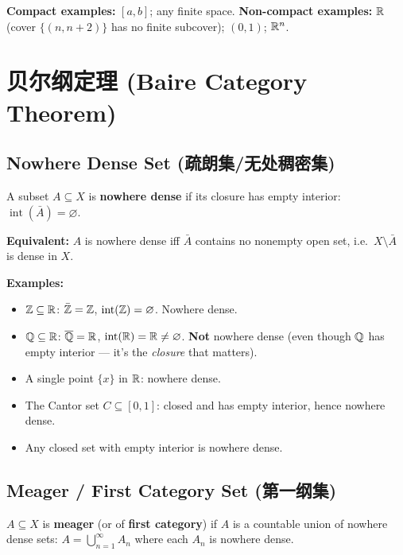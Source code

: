 \documentclass{article}
\begin{document}
\textbf{Compact examples:} $[a, b]$; any finite space.
\textbf{Non-compact examples:} $\mathbb{R}$ (cover $\{(n, n+2)\}$ has no
finite subcover); $(0, 1)$; $\mathbb{R}^n$.

\section{贝尔纲定理 (Baire Category Theorem)}

\subsection{Nowhere Dense Set (疏朗集/无处稠密集)}\label{def:nowhere-dense-baire}
\begin{definition}
  A subset $A \subseteq X$ is \textbf{nowhere dense} if its closure has
  empty interior: $\operatorname{int}(\bar{A}) = \varnothing$.
\end{definition}

\textbf{Equivalent:} $A$ is nowhere dense iff $\bar{A}$ contains no
nonempty open set, i.e.\ $X \setminus \bar{A}$ is dense in $X$.

\textbf{Examples:}
\begin{itemize}
  \item $\mathbb{Z} \subseteq \mathbb{R}$: $\bar{\mathbb{Z}} = \mathbb{Z}$, $\operatorname{int}(\mathbb{Z}) =
    \varnothing$.
    Nowhere dense.
  \item $\mathbb{Q} \subseteq \mathbb{R}$: $\overline{\mathbb{Q}} = \mathbb{R}$,
    $\operatorname{int}(\mathbb{R}) = \mathbb{R} \ne \varnothing$.
    \textbf{Not} nowhere dense (even though $\mathbb{Q}$ has empty interior --- it's the
    \emph{closure} that matters).
  \item A single point $\{x\}$ in $\mathbb{R}$: nowhere dense.
  \item The Cantor set $C \subseteq [0,1]$: closed and has empty interior,
    hence nowhere dense.
  \item Any closed set with empty interior is nowhere dense.
\end{itemize}

\subsection{Meager / First Category Set (第一纲集)}\label{def:meager}
\begin{definition}
  $A \subseteq X$ is \textbf{meager} (or of \textbf{first category}) if
  $A$ is a countable union of nowhere dense sets:
  $A = \bigcup_{n=1}^\infty A_n$ where each $A_n$ is nowhere dense.
\end{definition}
\end{document}
